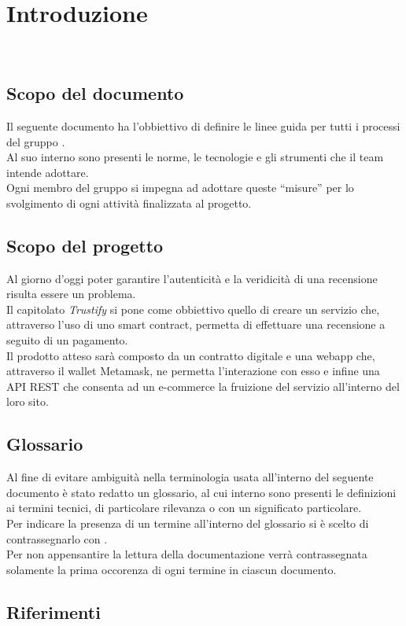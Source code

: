 \section{Introduzione}\
    \subsection{Scopo del documento}
    Il seguente documento ha l’obbiettivo di definire le linee guida per tutti i processi del gruppo \groupName. \\
    Al suo interno sono presenti le norme, le tecnologie e gli strumenti che il team intende adottare. \\
    Ogni membro del gruppo si impegna ad adottare queste “misure” per lo svolgimento di ogni attività finalizzata al progetto.

    \subsection{Scopo del progetto}
    Al giorno d’oggi poter garantire l’autenticità e la veridicità di una recensione risulta essere un problema. \\
    Il capitolato \textit{Trustify} si pone come obbiettivo quello di creare un servizio che, attraverso l’uso di uno smart contract, permetta di effettuare una recensione a seguito di un pagamento. \\
    Il prodotto atteso sarà composto da un contratto digitale e una webapp che, attraverso il wallet Metamask, ne permetta l’interazione con esso e infine una API REST che consenta ad un e-commerce la fruizione del servizio all’interno del loro sito.    

    \subsection{Glossario}
    Al fine di evitare ambiguità nella terminologia usata all’interno del seguente documento è stato redatto un glossario, al cui interno sono presenti le definizioni ai termini tecnici, di particolare rilevanza o con un significato particolare. \\
    Per indicare la presenza di un termine all'interno del glossario si è scelto di contrassegnarlo con \glo.\\
    Per non appensantire la lettura della documentazione verrà contrassegnata solamente la prima occorenza di ogni termine in ciascun documento.
    

    \subsection{Riferimenti}
